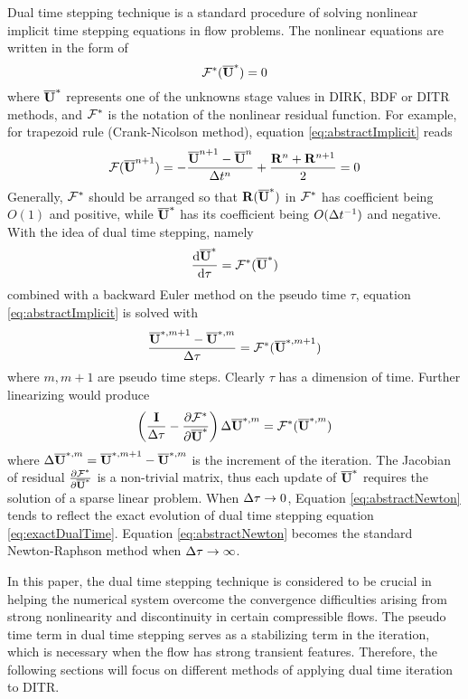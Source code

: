 Dual time stepping technique \cite{jameson1991time,jameson2017evaluation}
is a standard procedure of solving nonlinear
implicit time stepping equations
in flow problems.
The nonlinear equations are written in the form of
\begin{equation}
    \mathcal{F}^*(\overline{\mathbf{U}}^*) = 0
    \label{eq:abstractImplicit}
\end{equation}
where $\overline{\mathbf{U}}^*$ represents one of the unknowns stage values
in DIRK, BDF or DITR methods, and $\mathcal{F}^*$ is the notation of the nonlinear residual function.
For example, for trapezoid rule (Crank-Nicolson method),
equation \eqref{eq:abstractImplicit} reads
\begin{equation}
    \label{eq:trapF}
    \mathcal{F}(\overline{\mathbf{U}}^{n+1}) =
    -\frac{\overline{\mathbf{U}}^{n+1}-\overline{\mathbf{U}}^{n}}{{\Delta} t^n} + \frac{\mathbf{R}^{n} + \mathbf{R}^{n+1}}{2}
    =0
\end{equation}
Generally, $\mathcal{F}^*$ should be arranged so that
$\mathbf{R}(\overline{\mathbf{U}}^*)$ in $\mathcal{F}^*$ has coefficient being $O(1)$ and positive,
while $\overline{\mathbf{U}}^*$ has its coefficient being $O({\Delta} t^{-1})$ and negative.
With the idea of dual time stepping, namely
\begin{equation}
    \frac{\dd\overline{\mathbf{U}}^{*}}{\dd \tau} = \mathcal{F}^*(\overline{\mathbf{U}}^{*})
    \label{eq:exactDualTime}
\end{equation}
combined with a backward Euler method on the
pseudo time $\tau$, equation \eqref{eq:abstractImplicit}
is solved with
\begin{equation}
    \frac{\overline{\mathbf{U}}^{*,m+1} - \overline{\mathbf{U}}^{*,m}}{{\Delta} \tau} = \mathcal{F}^*(\overline{\mathbf{U}}^{*,m+1})
\end{equation}
where $m, m+1$ are pseudo time steps.
Clearly $\tau$ has a dimension of time.
Further linearizing would produce
\begin{equation}
    \left(\frac{\eye}{\inc\tau} -
    \partialderivative{\FF^*}{\uu^*}  \right)
    \inc\uu^{*,m} = \FF^*(\uu^{*,m})
    \label{eq:abstractNewton}
\end{equation}
where ${\Delta}\overline{\mathbf{U}}^{*,m} = \overline{\mathbf{U}}^{*,m+1} - \overline{\mathbf{U}}^{*,m}$ is the increment
of the iteration.
The Jacobian of residual $\partialderivative{\FF^*}{\uu^*}$
is a non-trivial matrix, thus each update of $\overline{\mathbf{U}}^*$ requires
the solution of a sparse linear problem.
When ${\Delta}\tau\rightarrow0$, Equation \eqref{eq:abstractNewton}
tends to reflect the exact evolution of dual time stepping
equation \eqref{eq:exactDualTime}.
Equation \eqref{eq:abstractNewton} becomes the
standard Newton-Raphson method when ${\Delta}\tau\rightarrow\infty$.

In this paper, the dual time stepping technique is considered to be crucial
in helping the numerical system overcome the convergence difficulties
arising from strong nonlinearity and discontinuity
in certain compressible flows.
The pseudo time term in dual time stepping
serves as a stabilizing term in the iteration,
which is necessary when the flow has strong transient features.
Therefore, the following sections will focus on different
methods of applying dual time iteration to DITR.

